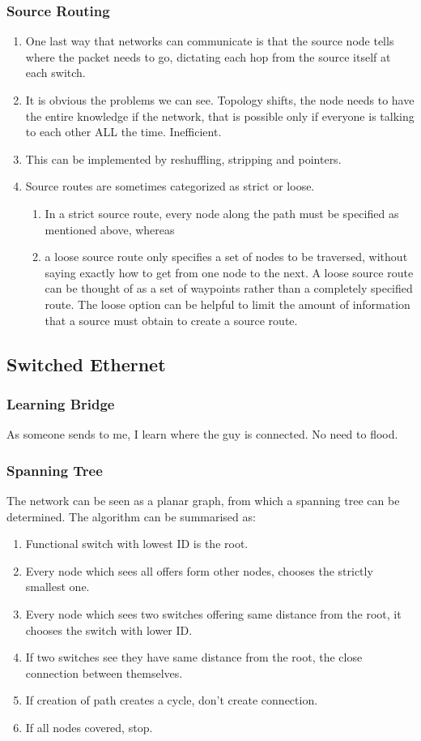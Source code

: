 \documentclass[11pt, a4paper]{article}
\begin{document}
\subsubsection{Source Routing}
\begin{enumerate}
    \item One last way that networks can communicate is that the source node tells where the packet needs to go, dictating each hop from the source itself at each switch.
    \item It is obvious the problems we can see. Topology shifts, the node needs to have the entire knowledge if the network, that is possible only if everyone is talking to each other ALL the time. Inefficient.
    \item This can be implemented by reshuffling, stripping and pointers.
    \item Source routes are sometimes categorized as strict or loose. 
    \begin{enumerate}
        \item In a strict source route, every node along the path must be specified as mentioned above, whereas 
        \item a loose source route only specifies a set of nodes to be traversed, without saying exactly how to get from one node to the next. A loose source route can be thought of as a set of waypoints rather than a completely specified route. The loose option can be helpful to limit the amount of information that a source must obtain to create a source route.
    \end{enumerate}
\end{enumerate}

\subsection{Switched Ethernet}
\subsubsection{Learning Bridge}
As someone sends to me, I learn where the guy is connected. No need to flood.

\subsubsection{Spanning Tree}
The network can be seen as a planar graph, from which a spanning tree can be determined. The algorithm can be summarised as:
\begin{enumerate}
    \item Functional switch with lowest ID is the root.
    \item Every node which sees all offers form other nodes, chooses the strictly smallest one.
    \item Every node which sees two switches offering same distance from the root, it chooses the switch with lower ID.
    \item If two switches see they have same distance from the root, the close connection between themselves.
    \item If creation of path creates a cycle, don't create connection.
    \item If all nodes covered, stop.
\end{enumerate}
\end{document}
